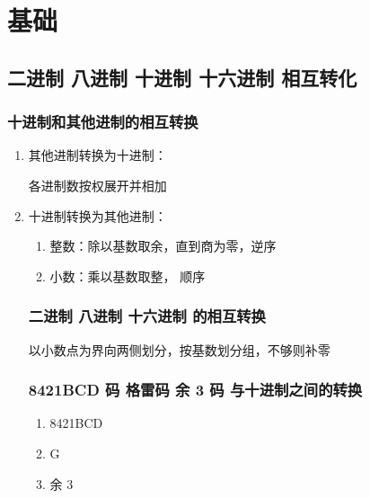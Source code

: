 \chapter{基础}
\newpage

\section{二进制 八进制 十进制 十六进制 相互转化}

\subsection{十进制和其他进制的相互转换}

\begin{enumerate}

\item 其他进制转换为十进制：

各进制数按权展开并相加

\item 十进制转换为其他进制：

\begin{enumerate}

    \item 整数：除以基数取余，直到商为零，逆序
    \item 小数：乘以基数取整， 顺序

\end{enumerate}

\newpage

\subsection{二进制 八进制 十六进制 的相互转换}
\newpage

以小数点为界向两侧划分，按基数划分组，不够则补零

\subsection{8421BCD 码 格雷码 余 3 码 与十进制之间的转换}

\begin{enumerate}

    \item 8421BCD
    \item G
    \item 余 3

\end{enumerate}

\newpage


\end{enumerate}
